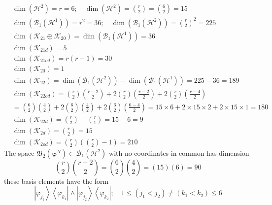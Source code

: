\documentclass[aps,preprint]{revtex4}%
\begin{document}
\begin{align}
&  \dim\left(  \mathcal{H}^{2}\right)  =r=6;\quad\dim\left(  \mathcal{H}%
^{2}\right)  =\binom{r}{2}=\binom{6}{2}=15\nonumber\\
&  \dim\left(  \mathcal{B}_{1}\left(  \mathcal{H}^{1}\right)  \right)
=r^{2}=36;\quad\dim\left(  \mathcal{B}_{1}\left(  \mathcal{H}^{2}\right)
\right)  =\binom{r}{2}^{2}=225\nonumber\\
&  \dim\left(  \mathcal{K}_{21}\oplus\mathcal{K}_{20}\right)  =\dim\left(
\mathcal{B}_{1}\left(  \mathcal{H}^{1}\right)  \right)  =36\nonumber\\
&  \dim\left(  \mathcal{K}_{21d}\right)  =5\nonumber\\
&  \dim\left(  \mathcal{K}_{21od}\right)  =r\left(  r-1\right)  =30\nonumber\\
&  \dim\left(  \mathcal{K}_{20}\right)  =1\nonumber\\
&  \dim\left(  \mathcal{K}_{22}\right)  =\dim\left(  \mathcal{B}_{1}\left(
\mathcal{H}^{2}\right)  \right)  -\dim\left(  \mathcal{B}_{1}\left(
\mathcal{H}^{1}\right)  \right)  =225-36=189\nonumber\\
&  \dim\left(  \mathcal{K}_{22od}\right)  =\binom{r}{2}\binom{r-2}{2}%
+2\binom{r}{2}\left(  \frac{r-2}{2}\right)  +2\binom{r}{2}\left(  \frac
{r-4}{2}\right) \nonumber\\
&  =\binom{6}{2}\binom{4}{2}+2\binom{6}{2}\left(  \frac{4}{2}\right)
+2\binom{6}{2}\left(  \frac{6-4}{2}\right)  =15\times6+2\times15\times
2+2\times15\times1=180\nonumber\\
&  \dim\left(  \mathcal{K}_{22d}\right)  =\binom{r}{2}-\binom{r}%
{1}=15-6=9\nonumber\\
&  \dim\left(  \mathcal{K}_{2d}\right)  =\binom{r}{2}=15\nonumber\\
&  \dim\left(  \mathcal{K}_{2od}\right)  =\binom{r}{2}\left(  \binom{r}%
{2}-1\right)  =210
\end{align}
The space $\mathfrak{B}_{2}\left(  \mathbf{\varphi}^{N}\right)  \subset
\mathcal{B}_{1}\left(  \mathcal{H}^{2}\right)  $ with no coordinates in common
has dimension
\begin{equation}
\binom{r}{2}\binom{r-2}{2}=\binom{6}{2}\binom{4}{2}=\left(  15\right)  \left(
6\right)  =90
\end{equation}
these basis elements have the form
\begin{equation}
\left\vert \varphi_{j_{1}}\right\rangle \left\langle \varphi_{k_{1}%
}\right\vert \wedge\left\vert \varphi_{j_{2}}\right\rangle \left\langle
\varphi_{k_{2}}\right\vert ;\quad1\leq\left(  j_{1}<j_{2}\right)  \neq\left(
k_{1}<k_{2}\right)  \leq6
\end{equation}
\end{document}
